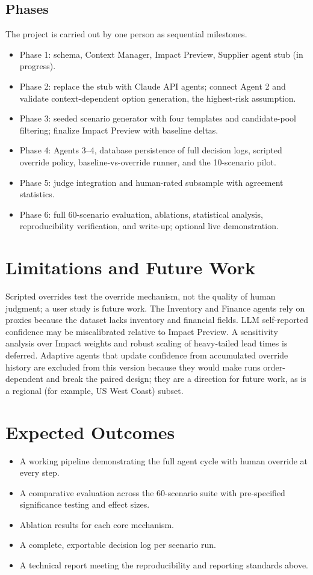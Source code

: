 \documentclass[conference]{IEEEtran}
\begin{document}
\subsection{Phases}
The project is carried out by one person as sequential milestones.
\begin{itemize}
\item Phase 1: schema, Context Manager, Impact Preview, Supplier agent stub (in progress).
\item Phase 2: replace the stub with Claude API agents; connect Agent 2 and validate context-dependent option generation, the highest-risk assumption.
\item Phase 3: seeded scenario generator with four templates and candidate-pool filtering; finalize Impact Preview with baseline deltas.
\item Phase 4: Agents 3--4, database persistence of full decision logs, scripted override policy, baseline-vs-override runner, and the 10-scenario pilot.
\item Phase 5: judge integration and human-rated subsample with agreement statistics.
\item Phase 6: full 60-scenario evaluation, ablations, statistical analysis, reproducibility verification, and write-up; optional live demonstration.
\end{itemize}

\section{Limitations and Future Work}
Scripted overrides test the override mechanism, not the quality of human judgment; a user study is future work. The Inventory and Finance agents rely on proxies because the dataset lacks inventory and financial fields. LLM self-reported confidence may be miscalibrated relative to Impact Preview. A sensitivity analysis over Impact weights and robust scaling of heavy-tailed lead times is deferred. Adaptive agents that update confidence from accumulated override history are excluded from this version because they would make runs order-dependent and break the paired design; they are a direction for future work, as is a regional (for example, US West Coast) subset.

\section{Expected Outcomes}
\begin{itemize}
\item A working pipeline demonstrating the full agent cycle with human override at every step.
\item A comparative evaluation across the 60-scenario suite with pre-specified significance testing and effect sizes.
\item Ablation results for each core mechanism.
\item A complete, exportable decision log per scenario run.
\item A technical report meeting the reproducibility and reporting standards above.
\end{itemize}
\end{document}
